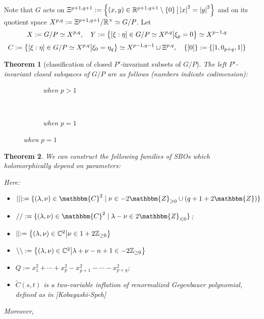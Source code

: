 \documentclass[10pt]{article} %
\newcommand{\assign}{:=}
\newtheorem{theorem}{Theorem}
\begin{document}
Note that $G$ acts on $\Xi^{p+1,q+1}:=\left\{(x,y)\in\mathbb{R}^{p+1,q+1}\setminus\left\{ 0 \right\}\big| \left|x\right|^2=\left|y\right|^2\right\}$ and on its quotient space
$X^{p,q}:=\Xi^{p+1,q+1}/\mathbb{R}^{\times}\simeq G/P$. Let
\[
	X:=G/P\simeq X^{p,q},\quad Y:=\left\{[\xi:\eta]\in G/P\simeq X^{p,q}\big| \xi_{p}=0\right\}\simeq X^{p-1,q}\]
	\[C:=\left\{[\xi:\eta]\in G/P\simeq X^{p,q}\big| \xi_{0}=\eta_q\right\}\simeq X^{p-1,q-1}\cup\Xi^{p,q},\quad\left\{ [0] \right\}:=\left\{ [1,0_{p+q},1] \right\}\]
\begin{theorem}[classification of closed $P'$-invariant subsets of $G/P$]
	The left $P'$-invariant closed subspaces of $G/P$ are as follows (numbers indicate codimension):\\
  \begin{figure}[H]
    \centering
    \begin{subfigure}[t]{0.3\textwidth}
	    \xymatrixrowsep{0.5pc}
	\caption{when $p>1$}
    \end{subfigure}
    ~ %
    \begin{subfigure}[t]{0.3\textwidth}
	    \xymatrixrowsep{0.5pc}
	    {}
	\caption{when $p=1$}
    \end{subfigure}
\end{figure}
\end{theorem}
\begin{theorem}
We can construct the following families of SBOs which holomorphically depend on parameters:\\

Here:
\begin{itemize}
	\item $\mid \mid \mid \assign \{ (\lambda, \nu) \in \mathbbm{C}^2 \mid \nu \in
	- 2\mathbbm{Z}_{\geqslant 0} \cup (q + 1 + 2\mathbbm{Z}) \}$ \item $/ / \assign
\{ (\lambda, \nu) \in \mathbbm{C}^2 \mid \lambda - \nu \in
2\mathbbm{Z}_{\leqslant 0} \}$;
\item $\mid\mid:=\left\{(\lambda,\nu)\in\mathbb{C}^2\big| \nu\in1+2\mathbb{Z}_{\ge0}\right\}$
\item $\backslash\backslash:=\left\{(\lambda,\nu)\in\mathbb{C}^2\big| \lambda+\nu-n+1\in-2\mathbb{Z}_{\ge0}\right\}$
\item $Q:=x_1^2+\cdots+x_p^2-x_{p+1}^2-\cdots-x_{p+q}^2$;
\item $\tilde{C}(s,t)$ is a two-variable inflation of renormalized Gegenbauer polynomial, defined as in [Kobayashi-Speh]
\end{itemize}
Moreover,\\
\end{theorem}
\end{document}
